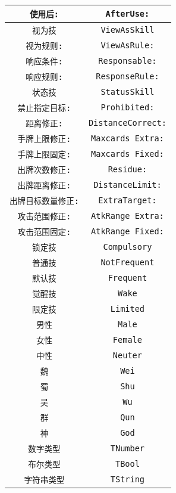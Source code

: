 \begin{center}
\begin{longtable}{|c|c|}
\hline \verb|使用后:| & \verb|AfterUse:| \\
\hline \verb|视为技| & \verb|ViewAsSkill| \\
\hline \verb|视为规则:| & \verb|ViewAsRule:| \\
\hline \verb|响应条件:| & \verb|Responsable:| \\
\hline \verb|响应规则:| & \verb|ResponseRule:| \\
\hline \verb|状态技| & \verb|StatusSkill| \\
\hline \verb|禁止指定目标:| & \verb|Prohibited:| \\
\hline \verb|距离修正:| & \verb|DistanceCorrect:| \\
\hline \verb|手牌上限修正:| & \verb|Maxcards Extra:| \\
\hline \verb|手牌上限固定:| & \verb|Maxcards Fixed:| \\
\hline \verb|出牌次数修正:| & \verb|Residue:| \\
\hline \verb|出牌距离修正:| & \verb|DistanceLimit:| \\
\hline \verb|出牌目标数量修正:| & \verb|ExtraTarget:| \\
\hline \verb|攻击范围修正:| & \verb|AtkRange Extra:| \\
\hline \verb|攻击范围固定:| & \verb|AtkRange Fixed:| \\
\hline \verb|锁定技| & \verb|Compulsory| \\
\hline \verb|普通技| & \verb|NotFrequent| \\
\hline \verb|默认技| & \verb|Frequent| \\
\hline \verb|觉醒技| & \verb|Wake| \\
\hline \verb|限定技| & \verb|Limited| \\
\hline \verb|男性| & \verb|Male| \\
\hline \verb|女性| & \verb|Female| \\
\hline \verb|中性| & \verb|Neuter| \\
\hline \verb|魏| & \verb|Wei| \\
\hline \verb|蜀| & \verb|Shu| \\
\hline \verb|吴| & \verb|Wu| \\
\hline \verb|群| & \verb|Qun| \\
\hline \verb|神| & \verb|God| \\
\hline \verb|数字类型| & \verb|TNumber| \\
\hline \verb|布尔类型| & \verb|TBool| \\
\hline \verb|字符串类型| & \verb|TString| \\

\end{longtable}
\end{center}
